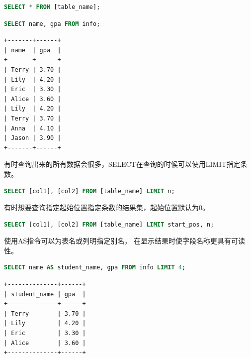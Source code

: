 \documentclass[12pt, openany, oneside]{book}
\begin{document}
\vspace{-0.5cm}

\begin{lstlisting}[language=SQL]
SELECT * FROM [table_name];
\end{lstlisting}

\vspace{0.5cm}


\begin{lstlisting}[language=SQL]
SELECT name, gpa FROM info;
\end{lstlisting}

\begin{tcolorbox}
	\begin{verbatim}
+-------+------+
| name  | gpa  |
+-------+------+
| Terry | 3.70 |
| Lily  | 4.20 |
| Eric  | 3.30 |
| Alice | 3.60 |
| Lily  | 4.20 |
| Terry | 3.70 |
| Anna  | 4.10 |
| Jason | 3.90 |
+-------+------+
\end{verbatim}
\end{tcolorbox}

有时查询出来的所有数据会很多，SELECT在查询的时候可以使用LIMIT指定条数。

\vspace{-0.5cm}

\begin{lstlisting}[language=SQL]
SELECT [col1], [col2] FROM [table_name] LIMIT n;
\end{lstlisting}

有时想要查询指定起始位置指定条数的结果集，起始位置默认为0。

\vspace{-0.5cm}

\begin{lstlisting}[language=SQL]
SELECT [col1], [col2] FROM [table_name] LIMIT start_pos, n;
\end{lstlisting}

使用AS指令可以为表名或列明指定别名， 在显示结果时使字段名称更具有可读性。\\


\begin{lstlisting}[language=SQL]
SELECT name AS student_name, gpa FROM info LIMIT 4;
\end{lstlisting}

\begin{tcolorbox}
	\begin{verbatim}
+--------------+------+
| student_name | gpa  |
+--------------+------+
| Terry        | 3.70 |
| Lily         | 4.20 |
| Eric         | 3.30 |
| Alice        | 3.60 |
+--------------+------+
\end{verbatim}
\end{tcolorbox}
\end{document}
